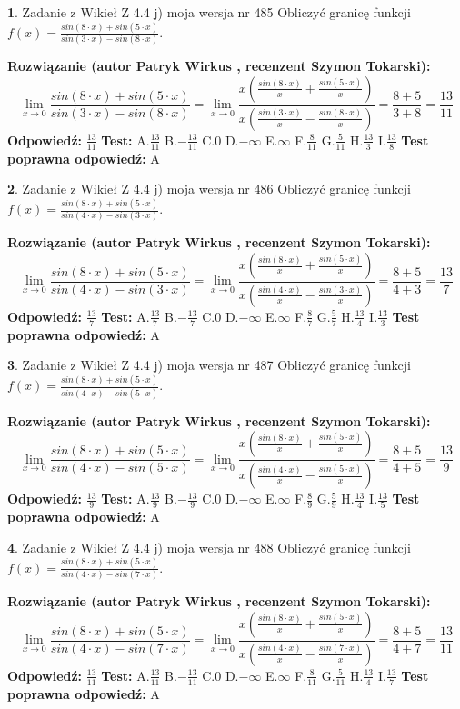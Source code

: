 \documentclass[12pt, a4paper]{article}
\theoremstyle{definition} %
\newtheorem{zad}{}
\newcommand{\zadStart}[1]{\begin{zad}#1\newline}
\newcommand{\zadStop}{\end{zad}}
\newcommand{\rozwStart}[2]{\noindent \textbf{Rozwiązanie (autor #1 , recenzent #2): }\newline}
\newcommand{\rozwStop}{\newline}
\newcommand{\odpStart}{\noindent \textbf{Odpowiedź:}\newline}
\newcommand{\odpStop}{\newline}
\newcommand{\testStart}{\noindent \textbf{Test:}\newline}
\newcommand{\testStop}{\newline}
\newcommand{\kluczStart}{\noindent \textbf{Test poprawna odpowiedź:}\newline}
\newcommand{\kluczStop}{\newline}
\begin{document}
\zadStart{Zadanie z Wikieł Z 4.4 j) moja wersja nr 485}
Obliczyć granicę funkcji $f(x)=\frac{sin(8\cdot x) +sin(5\cdot x)}{sin(3\cdot x) -sin(8\cdot x)}$.
\zadStop
\rozwStart{Patryk Wirkus}{Szymon Tokarski}
$$\lim\limits_{x\to 0}\frac{sin(8\cdot x) +sin(5\cdot x)}{sin(3\cdot x) -sin(8\cdot x)}=\lim\limits_{x\to 0}\frac{x(\frac{sin(8\cdot x)}{x}+\frac{sin(5\cdot x)}{x})}{x(\frac{sin(3\cdot x)}{x}-\frac{sin(8\cdot x)}{x})}=\frac{8+5}{3+8} = \frac{13}{11}$$
\rozwStop
\odpStart
$\frac{13}{11}$
\odpStop
\testStart
A.$\frac{13}{11}$
B.$-\frac{13}{11}$
C.$0$
D.$-\infty$
E.$\infty$
F.$\frac{8}{11}$
G.$\frac{5}{11}$
H.$\frac{13}{3}$
I.$\frac{13}{8}$
\testStop
\kluczStart
A
\kluczStop



\zadStart{Zadanie z Wikieł Z 4.4 j) moja wersja nr 486}
Obliczyć granicę funkcji $f(x)=\frac{sin(8\cdot x) +sin(5\cdot x)}{sin(4\cdot x) -sin(3\cdot x)}$.
\zadStop
\rozwStart{Patryk Wirkus}{Szymon Tokarski}
$$\lim\limits_{x\to 0}\frac{sin(8\cdot x) +sin(5\cdot x)}{sin(4\cdot x) -sin(3\cdot x)}=\lim\limits_{x\to 0}\frac{x(\frac{sin(8\cdot x)}{x}+\frac{sin(5\cdot x)}{x})}{x(\frac{sin(4\cdot x)}{x}-\frac{sin(3\cdot x)}{x})}=\frac{8+5}{4+3} = \frac{13}{7}$$
\rozwStop
\odpStart
$\frac{13}{7}$
\odpStop
\testStart
A.$\frac{13}{7}$
B.$-\frac{13}{7}$
C.$0$
D.$-\infty$
E.$\infty$
F.$\frac{8}{7}$
G.$\frac{5}{7}$
H.$\frac{13}{4}$
I.$\frac{13}{3}$
\testStop
\kluczStart
A
\kluczStop



\zadStart{Zadanie z Wikieł Z 4.4 j) moja wersja nr 487}
Obliczyć granicę funkcji $f(x)=\frac{sin(8\cdot x) +sin(5\cdot x)}{sin(4\cdot x) -sin(5\cdot x)}$.
\zadStop
\rozwStart{Patryk Wirkus}{Szymon Tokarski}
$$\lim\limits_{x\to 0}\frac{sin(8\cdot x) +sin(5\cdot x)}{sin(4\cdot x) -sin(5\cdot x)}=\lim\limits_{x\to 0}\frac{x(\frac{sin(8\cdot x)}{x}+\frac{sin(5\cdot x)}{x})}{x(\frac{sin(4\cdot x)}{x}-\frac{sin(5\cdot x)}{x})}=\frac{8+5}{4+5} = \frac{13}{9}$$
\rozwStop
\odpStart
$\frac{13}{9}$
\odpStop
\testStart
A.$\frac{13}{9}$
B.$-\frac{13}{9}$
C.$0$
D.$-\infty$
E.$\infty$
F.$\frac{8}{9}$
G.$\frac{5}{9}$
H.$\frac{13}{4}$
I.$\frac{13}{5}$
\testStop
\kluczStart
A
\kluczStop



\zadStart{Zadanie z Wikieł Z 4.4 j) moja wersja nr 488}
Obliczyć granicę funkcji $f(x)=\frac{sin(8\cdot x) +sin(5\cdot x)}{sin(4\cdot x) -sin(7\cdot x)}$.
\zadStop
\rozwStart{Patryk Wirkus}{Szymon Tokarski}
$$\lim\limits_{x\to 0}\frac{sin(8\cdot x) +sin(5\cdot x)}{sin(4\cdot x) -sin(7\cdot x)}=\lim\limits_{x\to 0}\frac{x(\frac{sin(8\cdot x)}{x}+\frac{sin(5\cdot x)}{x})}{x(\frac{sin(4\cdot x)}{x}-\frac{sin(7\cdot x)}{x})}=\frac{8+5}{4+7} = \frac{13}{11}$$
\rozwStop
\odpStart
$\frac{13}{11}$
\odpStop
\testStart
A.$\frac{13}{11}$
B.$-\frac{13}{11}$
C.$0$
D.$-\infty$
E.$\infty$
F.$\frac{8}{11}$
G.$\frac{5}{11}$
H.$\frac{13}{4}$
I.$\frac{13}{7}$
\testStop
\kluczStart
A
\kluczStop
\end{document}
